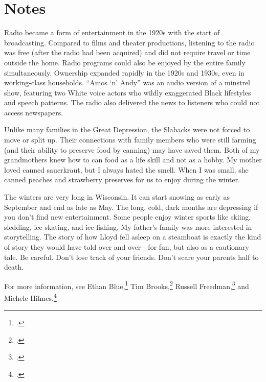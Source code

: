 \documentclass[
  american,
  letterpaper,
]{book}
\begin{document}
\section{Notes}\label{notes-10}

Radio became a form of entertainment in the 1920s with the start of
broadcasting. Compared to films and theater productions, listening to
the radio was free (after the radio had been acquired) and did not
require travel or time outside the home. Radio programs could also be
enjoyed by the entire family simultaneously. Ownership expanded rapidly
in the 1920s and 1930s, even in working-class households. ``Amos `n'
Andy'' was an audio version of a minstrel show, featuring two White
voice actors who wildly exaggerated Black lifestyles and speech
patterns. The radio also delivered the news to listeners who could not
access newspapers.

Unlike many families in the Great Depression, the Slabacks were not
forced to move or split up. Their connections with family members who
were still farming (and their ability to preserve food by canning) may
have saved them. Both of my grandmothers knew how to can food as a life
skill and not as a hobby. My mother loved canned sauerkraut, but I
always hated the smell. When I was small, she canned peaches and
strawberry preserves for us to enjoy during the winter.

The winters are very long in Wisconsin. It can start snowing as early as
September and end as late as May. The long, cold, dark months are
depressing if you don't find new entertainment. Some people enjoy winter
sports like skiing, sledding, ice skating, and ice fishing. My father's
family was more interested in storytelling. The story of how Lloyd fell
asleep on a steamboat is exactly the kind of story they would have told
over and over---for fun, but also as a cautionary tale. Be careful.
Don't lose track of your friends. Don't scare your parents half to
death.

For more information, see Ethan Blue,\footnote{.} Tim Brooks,\footnote{.} Russell Freedman,\footnote{.} and
Michele Hilmes.\footnote{.}
\end{document}
